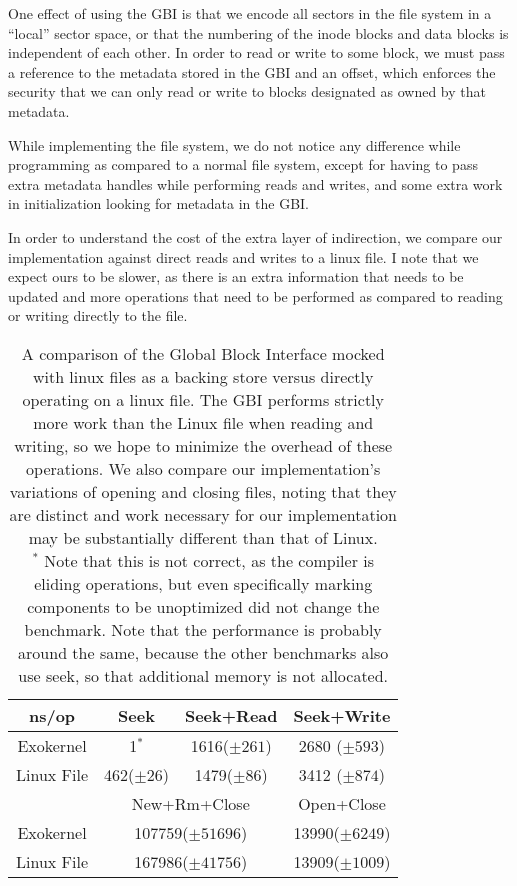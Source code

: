 \documentclass[letterpaper,twocolumn,10pt]{article}
\begin{document}
One effect of using the GBI is that we encode all sectors in the file system in
a ``local'' sector space, or that the numbering of the inode blocks and data blocks is
independent of each other. In order to read or write to some block, we must pass a reference to
the metadata stored in the GBI and an offset, which enforces the security that we can only read
or write to blocks designated as owned by that metadata.

While implementing the file system, we do not notice any difference while programming as compared
to a normal file system, except for having to pass extra metadata handles while performing reads
and writes, and some extra work in initialization looking for metadata in the GBI.

In order to understand the cost of the extra layer of indirection, we compare our implementation
against direct reads and writes to a linux file. I note that we expect ours to be slower, as
there is an extra information that needs to be updated and more operations that need to be
performed as compared to reading or writing directly to the file.

\begin{table}[t]
  \centering
  \begin{tabular}{|c|c|c|c|}
    \hline
    ns/op      & Seek      & Seek+Read  & Seek+Write \\
    \hline
    Exokernel  & 1$^{*}$& 1616($\pm 261$) & 2680 ($\pm 593$) \\
    \hline
    Linux File & 462($\pm 26$)    & 1479($\pm 86$) & 3412 ($\pm 874$) \\
    \hline
               & \multicolumn{2}{c|}{New+Rm+Close} & Open+Close \\
    \hline
    Exokernel  & \multicolumn{2}{c|}{107759($\pm 51696$)} & 13990($\pm 6249$) \\
    \hline
    Linux File & \multicolumn{2}{c|}{167986($\pm 41756$)} & 13909($\pm 1009$) \\
    \hline
  \end{tabular}
  \caption{
    \label{tab:cmp}
    A comparison of the Global Block Interface mocked with linux files as a backing store versus
    directly operating on a linux file. The GBI performs strictly more work than the Linux file
    when reading and writing, so we hope to minimize the overhead of these operations. We also
    compare our implementation's variations of opening and closing files, noting that they are
    distinct and work necessary for our implementation may be substantially different than that
    of Linux.
    \\
    $^*$ Note that this is not correct, as the compiler is
    eliding operations, but even specifically marking components to be unoptimized did not
    change the benchmark. Note that the performance is probably around the same, because
    the other benchmarks also use seek, so that additional memory is not allocated.
  }
\end{table}
\end{document}

